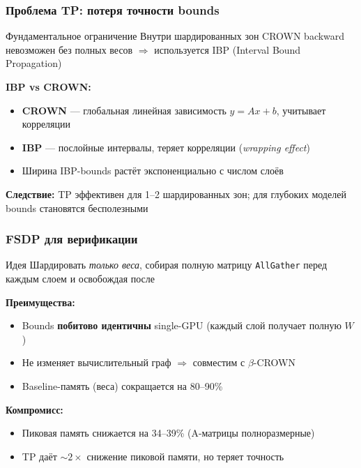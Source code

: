 \begin{frame}
\frametitle{Проблема TP: потеря точности bounds}

\begin{alertblock}{Фундаментальное ограничение}
Внутри шардированных зон CROWN backward невозможен без полных весов $\Rightarrow$ используется IBP (Interval Bound Propagation)
\end{alertblock}

\vspace{0.3cm}

\textbf{IBP vs CROWN:}
\begin{itemize}
    \item \textbf{CROWN} --- глобальная линейная зависимость $y = Ax + b$, учитывает корреляции
    \item \textbf{IBP} --- послойные интервалы, теряет корреляции (\textit{wrapping effect})
    \item Ширина IBP-bounds растёт экспоненциально с числом слоёв
\end{itemize}

\vspace{0.3cm}

\textbf{Следствие:} TP эффективен для 1--2 шардированных зон; для глубоких моделей bounds становятся бесполезными

\end{frame}

\begin{frame}
\frametitle{FSDP для верификации}

\begin{block}{Идея}
Шардировать \textit{только веса}, собирая полную матрицу \texttt{AllGather} перед каждым слоем и освобождая после
\end{block}

\vspace{0.3cm}

\textbf{Преимущества:}
\begin{itemize}
    \item Bounds \textbf{побитово идентичны} single-GPU (каждый слой получает полную $W$)
    \item Не изменяет вычислительный граф $\Rightarrow$ совместим с $\beta$-CROWN
    \item Baseline-память (веса) сокращается на 80--90\%
\end{itemize}

\vspace{0.3cm}

\textbf{Компромисс:}
\begin{itemize}
    \item Пиковая память снижается на 34--39\% (A-матрицы полноразмерные)
    \item TP даёт $\sim\!2\times$ снижение пиковой памяти, но теряет точность
\end{itemize}

\end{frame}

